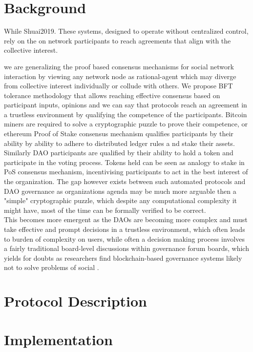\documentclass{article}
\begin{document}
\begin{CJK}{UTF8}{gbsn}
\begin{multicols}{2}
\section{Background}
While {Shuai2019}.
These systems, designed to operate without centralized control, rely on the on network participants to reach agreements that align with the collective interest.


we are generalizing the proof based consensus mechanisms for social network interaction by viewing any network node as rational-agent which may diverge from collective interest \cite{Philip2019} individually or collude with others. We propose BFT tolerance methodology that allows reaching effective consensus based on participant inputs, opinions and  we can say that protocols reach an agreement in a trustless environment by qualifying the competence of the participants. Bitcoin miners are required to solve a cryptographic puzzle to prove their competence, or ethereum Proof of Stake consensus mechanism qualifies participants by their ability by ability to adhere to distributed ledger rules a   nd stake their assets. \\ Similarly DAO participants are qualified by their ability to hold a token and participate in the voting process. Tokens held can be seen as analogy to stake in PoS consensus mechanism, incentivising participants to act in the best interest of the organization. The gap however exists between such automated protocols and DAO governance as organizations agenda may be much more arguable then a "simple" cryptographic puzzle, which despite any computational complexity it might have, most of the time can be formally verified to be correct.\\
This becomes more emergent as the DAOs are becoming more complex and must take effective and prompt decisions in a trustless environment, which often leads to burden of complexity on users, while often a decision making process involves a fairly traditional board-level discussions within governance forum boards, which yields for doubts as researchers find blockchain-based governance systems likely not to solve problems of social .

\section{Protocol Description}
\section{Implementation}


\end{multicols}
\end{CJK}
\end{document}
